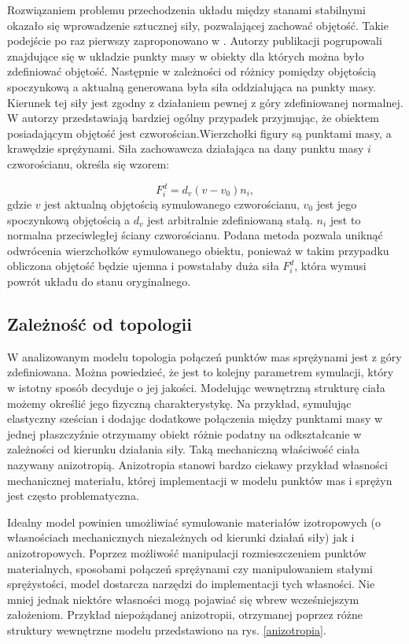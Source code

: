 Rozwiązaniem problemu przechodzenia układu między stanami stabilnymi okazało się
wprowadzenie sztucznej siły, pozwalającej zachować objętość. Takie podejście po
raz pierwszy zaproponowano w \cite{rmofa}. Autorzy publikacji pogrupowali
znajdujące się w układzie punkty masy w obiekty dla których można było
zdefiniować objętość. Następnie w zależności od różnicy pomiędzy objętością
spoczynkową a aktualną generowana była siła oddziałująca na punkty masy. Kierunek
tej siły jest zgodny z działaniem pewnej z góry zdefiniowanej normalnej. W
\cite{isodb} autorzy przedstawiają bardziej ogólny przypadek przyjmując, że
obiektem posiadającym objętość jest czworościan.Wierzchołki figury są punktami
masy, a krawędzie sprężynami. Siła zachowawcza działająca na dany punktu masy
$i$ czworościanu, określa się wzorem:

\begin{equation}
F_i^d = d_v ( v - v_0) n_i,
\end{equation}
gdzie $v$ jest aktualną objętością symulowanego czworościanu, $v_0$ jest jego
spoczynkową objętością a $d_v$ jest arbitralnie zdefiniowaną stałą. $n_i$ jest
to normalna przeciwległej ściany czworościanu. Podana metoda pozwala uniknąć
odwrócenia wierzchołków symulowanego obiektu, ponieważ w takim przypadku
obliczona objętość będzie ujemna i powstałaby duża siła $F_i^d$, która wymusi powrót
układu do stanu oryginalnego\cite{isodb}.

\subsection{Zależność od topologii}
W analizowanym modelu topologia połączeń punktów mas sprężynami jest z góry
zdefiniowana. Można powiedzieć, że jest to kolejny parametrem symulacji, który w
istotny sposób decyduje o jej jakości. Modelując wewnętrzną strukturę ciała możemy określić jego fizyczną
charakterystykę. Na przykład, symulując elastyczny sześcian i dodając dodatkowe
połączenia między punktami masy w jednej płaszczyźnie otrzymamy obiekt różnie
podatny na odkształcanie w zależności od kierunku działania siły. Taką
mechaniczną właściwość ciała nazywany anizotropią. Anizotropia stanowi bardzo
ciekawy przykład własności mechanicznej materiału, której implementacji w modelu
punktów mas i sprężyn jest często problematyczna. 

Idealny model powinien umożliwiać symulowanie materiałów izotropowych (o
		własnościach mechanicznych niezależnych od kierunki działań siły) jak i
anizotropowych. Poprzez możliwość manipulacji rozmieszczeniem punktów
materialnych, sposobami połączeń sprężynami czy manipulowaniem stałymi
sprężystości, model dostarcza narzędzi do implementacji tych własności. Nie
mniej jednak niektóre własności mogą pojawiać się wbrew wcześniejszym
założeniom. Przykład niepożądanej anizotropii, otrzymanej poprzez różne
struktury wewnętrzne modelu przedstawiono na rys. \ref{anizotropia}.

